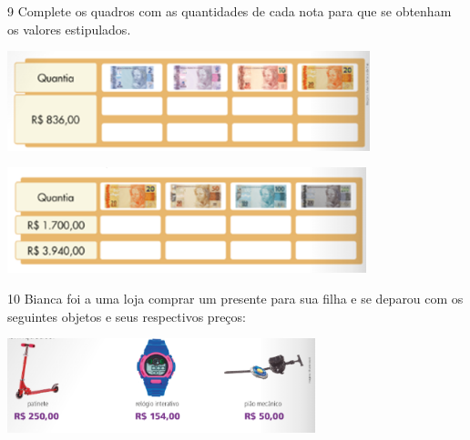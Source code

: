 
\num{9}  Complete os quadros com as quantidades de cada nota para que se
obtenham os valores estipulados.

\begin{escolha}

\item
\includegraphics[width=4.14203in,height=1.14177in]{./media/image77.png}


\item
\includegraphics[width=4.10036in,height=1.20844in]{./media/image78.png}
\end{escolha}


\num{10} Bianca foi a uma loja comprar um presente para sua filha e se deparou
com os seguintes objetos e seus respectivos preços:


\includegraphics[width=3.51697in,height=1.08343in]{./media/image80.png}

